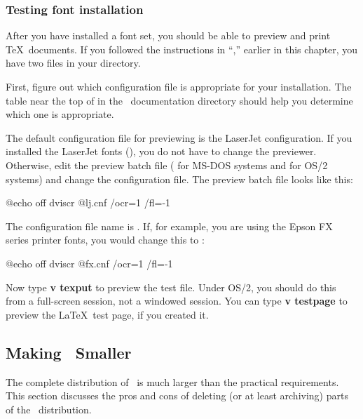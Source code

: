 \subsubsection{Testing font installation}

After you have installed a font set, you should be able to preview and
print \TeX\ documents.  If you followed the instructions in
``,'' earlier in this chapter, you have
two  files in your  directory.

First, figure out which configuration file is appropriate
for your installation.  The table near the top of 
in the \emTeX\ documentation directory should help you determine which
one is appropriate.

The default configuration file for previewing is the LaserJet configuration.
If you installed the LaserJet fonts (), you do not have to
change the previewer.  Otherwise, edit the preview batch file (
for MS-DOS systems and  for OS/2 systems) and change the 
configuration file.  The preview batch file looks like this:

\begin{shortexample}
@echo off
dviscr @lj.cnf /ocr=1 /fl=-1 %
\end{shortexample}

The configuration file name is .  If, for example, you
are using the Epson FX series printer fonts, you would change this to
:

\begin{shortexample}
@echo off
dviscr @fx.cnf /ocr=1 /fl=-1 %
\end{shortexample}

Now type \textbf{v texput} to preview the test file.  Under OS/2, you 
should do this from a full-screen session, not a windowed session.  You
can type \textbf{v testpage} to preview the \LaTeX\ test page, if you
created it.

\subsection{Making \protect\emTeX\ Smaller}
\label{sec:emtex:smaller}

The complete 
distribution of \emTeX\ is much larger than the
practical requirements.  This section discusses the pros and cons of
deleting (or at least archiving) parts of the \emTeX\ distribution.

